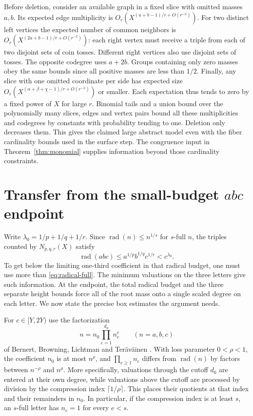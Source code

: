 \documentclass[11pt,reqno]{amsart}
\DeclareMathOperator{\rad}{rad}
\begin{document}
Before deletion, consider an available graph in a fixed slice
with omitted masses \(a,b\). Its expected edge multiplicity is
\(O_r(X^{(a+b-1)/r+O(r^{-2})})\). For two distinct left vertices
the expected number of common neighbors is
\(O_r(X^{(2a+b-1)/r+O(r^{-2})})\): each right vertex must
receive a triple from each of two disjoint sets of coin tosses.
Different right vertices also use disjoint sets of tosses.
The opposite codegree uses \(a+2b\). Groups containing only
zero masses obey the same bounds since all positive masses
are less than \(1/2\). Finally, any slice with one omitted
coordinate per side has expected size
\(O_r(X^{(\alpha+\beta+\chi-1)/r+O(r^{-2})})\) or smaller.
Each expectation thus tends to zero by a fixed power of \(X\)
for large \(r\). Binomial tails and a union bound over the
polynomially many slices, edges and vertex pairs bound all
these multiplicities and codegrees by constants with
probability tending to one. Deletion only decreases them.
This gives the claimed large abstract model even with the
fiber cardinality bounds used in the surface step. The
congruence input in Theorem~\ref{thm:monomial} supplies
information beyond those cardinality constraints.

\section{Transfer from the small-budget \texorpdfstring{\(abc\)}{abc} endpoint}
\label{sec:abc-endpoint-transfer}

Write \(\lambda_0=1/p+1/q+1/r\). Since \(\rad(n)\le n^{1/s}\)
for \(s\)-full \(n\), the triples counted by \(N_{p,q,r}(X)\)
satisfy
\begin{equation}\label{eq:radical-full}
  \rad(abc)\le a^{1/p}b^{1/q}c^{1/r}<c^{\lambda_0}.
\end{equation}
To get below the limiting one-third coefficient in that radical
budget, one must use more than \eqref{eq:radical-full}. The minimum
valuations on the three letters give such information. At the
endpoint, the total radical budget and the three separate height
bounds force all of the root mass onto a single scaled degree on
each letter. We now state the precise box estimates the argument needs.

For \(c\in[Y,2Y)\) use the factorization
\[
   n=n_0\prod_{e=1}^{d_0} n_e^e
       \qquad (n=a,b,c)
\]
of Bernert, Browning, Lichtman and Ter\"av\"ainen
\cite[Lemma~2.2]{BBLT}. With loss parameter \(0<\rho<1\), the
coefficient \(n_0\) is at most \(n^\rho\), and
\(\prod_{e\ge1}n_e\) differs from \(\rad(n)\) by factors between
\(n^{-\rho}\) and \(n^\rho\). More specifically, valuations through
the cutoff \(d_0\) are entered at their own degree, while valuations
above the cutoff are processed by division by the compression index
\(\lceil 1/\rho\rceil\). This places their quotients at that index and
their remainders in \(n_0\). In particular, if the compression index
is at least \(s\), an \(s\)-full letter has \(n_e=1\) for every
\(e<s\).
\end{document}
